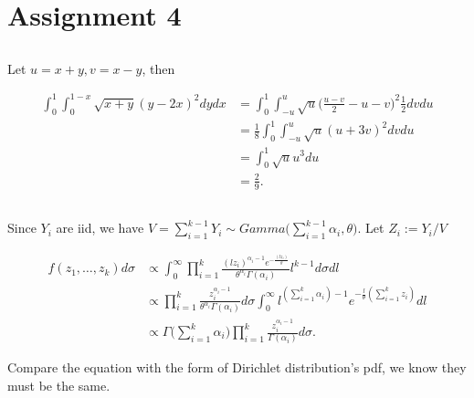 \clearpage
\section{Assignment 4}

\subsection{} %

Let $u = x+y, v=x-y$, then

\begin{align}
    \int_0^1\int_0^{1-x}\sqrt{x+y}(y-2x)^2dydx
        &= \int_0^1\int_{-u}^{u}\sqrt{u}\bigg(\frac{u-v}{2}-u-v\bigg)^2 \frac{1}{2} dvdu \\
        &= \frac{1}{8} \int_0^1\int_{-u}^{u} \sqrt{u} (u+3v)^2 dvdu \\
        &= \int_0^1 \sqrt{u} u^3 du \\
        &= \frac{2}{9}.
\end{align}

\subsection{} %

Since $Y_i$ are iid, we have $V=\sum_{i=1}^{k-1} Y_i\sim Gamma\big(\sum_{i=1}^{k-1} \alpha_i, \theta\big)$.
Let $Z_i:=Y_i/V$

\begin{align}
    f(z_1,\dots,z_k) d\sigma
        &\propto \int_0^\infty \prod_{i=1}^{k}\frac{(lz_i)^{\alpha_i-1}e^{-\frac{(lz_i)}{\theta}}}{\theta^{\alpha_i}\Gamma(\alpha_i)} l^{k-1} d\sigma dl \\
        &\propto \prod_{i=1}^{k}\frac{z_i^{\alpha_i-1}}{\theta^{\alpha_i}\Gamma(\alpha_i)} d\sigma  \int_0^\infty l^{(\sum_{i=1}^k\alpha_i) - 1} e^{-\frac{l}{\theta}(\sum_{i=1}^k z_i)}dl \\
        &\propto \Gamma\bigg(\sum_{i=1}^k\alpha_i\bigg)\prod_{i=1}^{k}\frac{z_i^{\alpha_i-1}}{\Gamma(\alpha_i)} d\sigma.
\end{align}

Compare the equation with the form of Dirichlet distribution's pdf,
we know they must be the same.

